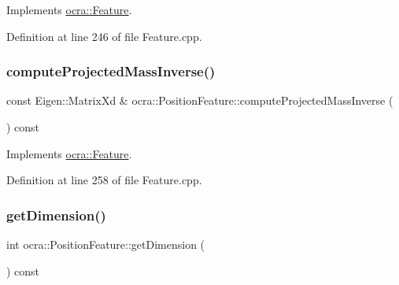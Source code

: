 Implements \hyperlink{classocra_1_1Feature_ac529096b3fe8eba1ab88a56d8b042d37}{ocra\+::\+Feature}.



Definition at line 246 of file Feature.\+cpp.

\hypertarget{classocra_1_1PositionFeature_a376ba3d167f5937ce97ccec0a27e2adf}{}\label{classocra_1_1PositionFeature_a376ba3d167f5937ce97ccec0a27e2adf} 
\subsubsection{\texorpdfstring{compute\+Projected\+Mass\+Inverse()}{computeProjectedMassInverse()}\hspace{0.1cm}{\footnotesize\ttfamily [2/2]}}
{\footnotesize\ttfamily const Eigen\+::\+Matrix\+Xd \& ocra\+::\+Position\+Feature\+::compute\+Projected\+Mass\+Inverse (\begin{DoxyParamCaption}{ }\end{DoxyParamCaption}) const\hspace{0.3cm}{\ttfamily [virtual]}}



Implements \hyperlink{classocra_1_1Feature_ac27bcbdbb8541e3b4e2c77a6d6f2ffc0}{ocra\+::\+Feature}.



Definition at line 258 of file Feature.\+cpp.

\hypertarget{classocra_1_1PositionFeature_a1fa18a892139ae4e962f189cedd699c0}{}\label{classocra_1_1PositionFeature_a1fa18a892139ae4e962f189cedd699c0} 
\subsubsection{\texorpdfstring{get\+Dimension()}{getDimension()}}
{\footnotesize\ttfamily int ocra\+::\+Position\+Feature\+::get\+Dimension (\begin{DoxyParamCaption}{ }\end{DoxyParamCaption}) const\hspace{0.3cm}{\ttfamily [virtual]}}



